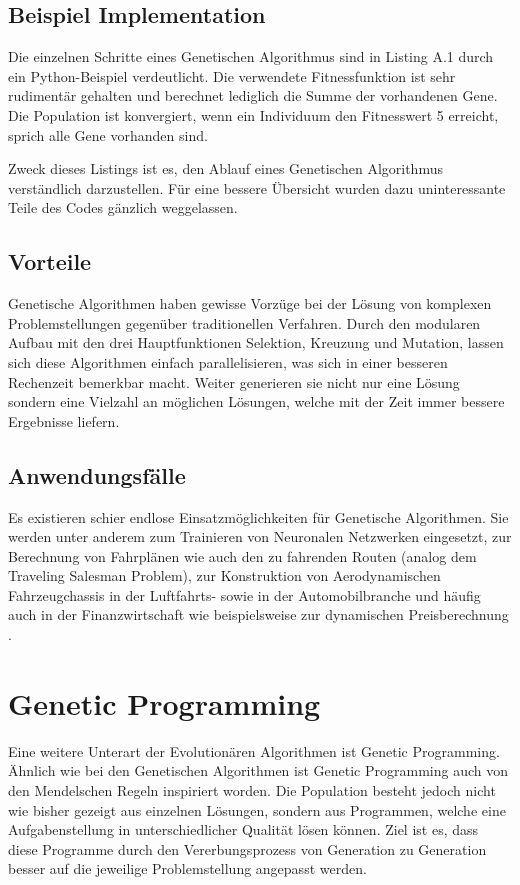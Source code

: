 \subsection{Beispiel Implementation}
Die einzelnen Schritte eines Genetischen Algorithmus sind in Listing A.1 durch
ein Python-Beispiel verdeutlicht. Die verwendete Fitnessfunktion ist sehr rudimentär
gehalten und berechnet lediglich die Summe der vorhandenen Gene. Die Population ist konvergiert,
wenn ein Individuum den Fitnesswert 5 erreicht, sprich alle Gene vorhanden sind.

Zweck dieses Listings ist es, den Ablauf eines Genetischen Algorithmus verständlich darzustellen.
Für eine bessere Übersicht wurden dazu uninteressante Teile des Codes gänzlich weggelassen.

\subsection{Vorteile}
Genetische Algorithmen haben gewisse Vorzüge bei der Lösung von komplexen
Problemstellungen gegenüber traditionellen Verfahren. Durch den modularen Aufbau
mit den drei Hauptfunktionen Selektion, Kreuzung und Mutation, lassen sich diese
Algorithmen einfach parallelisieren, was sich in einer besseren Rechenzeit bemerkbar
macht. Weiter generieren sie nicht nur eine Lösung sondern eine Vielzahl an möglichen
Lösungen, welche mit der Zeit immer bessere Ergebnisse liefern. \cite{Gou19}

\subsection{Anwendungsfälle}
Es existieren schier endlose Einsatzmöglichkeiten für Genetische Algorithmen. Sie werden unter anderem
zum Trainieren von Neuronalen Netzwerken eingesetzt, zur Berechnung von Fahrplänen wie auch den zu fahrenden
Routen (analog dem Traveling Salesman Problem), zur Konstruktion von Aerodynamischen Fahrzeugchassis in
der Luftfahrts- sowie in der Automobilbranche und häufig auch in der Finanzwirtschaft wie beispielsweise
zur dynamischen Preisberechnung \cite{Tut}.

\section{Genetic Programming}
Eine weitere Unterart der Evolutionären Algorithmen ist Genetic Programming. Ähnlich wie
bei den Genetischen Algorithmen ist Genetic Programming auch von den Mendelschen Regeln
inspiriert worden. Die Population besteht jedoch nicht wie bisher gezeigt aus einzelnen
Lösungen, sondern aus Programmen, welche eine Aufgabenstellung in unterschiedlicher
Qualität lösen können. Ziel ist es, dass diese Programme durch den Vererbungsprozess
von Generation zu Generation besser auf die jeweilige Problemstellung angepasst werden.
\cite{GenGP}

